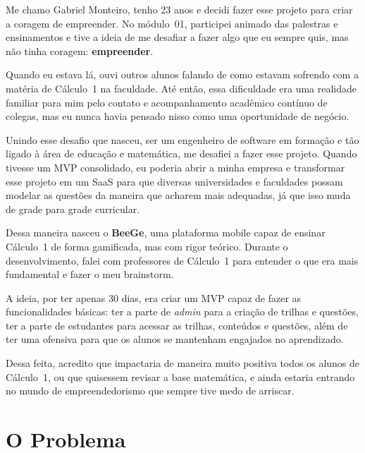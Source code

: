 \documentclass[12pt, a4paper]{article}
\begin{document}
\begin{destaque}
Me chamo Gabriel Monteiro, tenho 23 anos e decidi fazer esse projeto para criar a coragem de empreender. No m\'{o}dulo~01, participei animado das palestras e ensinamentos e tive a ideia de me desafiar a fazer algo que eu sempre quis, mas n\~{a}o tinha coragem: \textbf{empreender}.

Quando eu estava l\'{a}, ouvi outros alunos falando de como estavam sofrendo com a mat\'{e}ria de C\'{a}lculo~1 na faculdade. At\'{e} ent\~{a}o, essa dificuldade era uma realidade familiar para mim pelo contato e acompanhamento acad\^{e}mico cont\'{i}nuo de colegas, mas eu nunca havia pensado nisso como uma oportunidade de neg\'{o}cio.

Unindo esse desafio que nasceu, ser um engenheiro de software em forma\c{c}\~{a}o e t\~{a}o ligado \`{a} \'{a}rea de educa\c{c}\~{a}o e matem\'{a}tica, me desafiei a fazer esse projeto. Quando tivesse um MVP consolidado, eu poderia abrir a minha empresa e transformar esse projeto em um SaaS para que diversas universidades e faculdades possam modelar as quest\~{o}es da maneira que acharem mais adequadas, j\'{a} que isso muda de grade para grade curricular.

Dessa maneira nasceu o \textbf{BeeGe}, uma plataforma mobile capaz de ensinar C\'{a}lculo~1 de forma gamificada, mas com rigor te\'{o}rico. Durante o desenvolvimento, falei com professores de C\'{a}lculo~1 para entender o que era mais fundamental e fazer o meu brainstorm.

A ideia, por ter apenas 30 dias, era criar um MVP capaz de fazer as funcionalidades b\'{a}sicas: ter a parte de \textit{admin} para a cria\c{c}\~{a}o de trilhas e quest\~{o}es, ter a parte de estudantes para acessar as trilhas, conte\'{u}dos e quest\~{o}es, al\'{e}m de ter uma ofensiva para que os alunos se mantenham engajados no aprendizado.

Dessa feita, acredito que impactaria de maneira muito positiva todos os alunos de C\'{a}lculo~1, ou que quisessem revisar a base matem\'{a}tica, e ainda estaria entrando no mundo de empreendedorismo que sempre tive medo de arriscar.
\end{destaque}

\section{O Problema}
\end{document}
